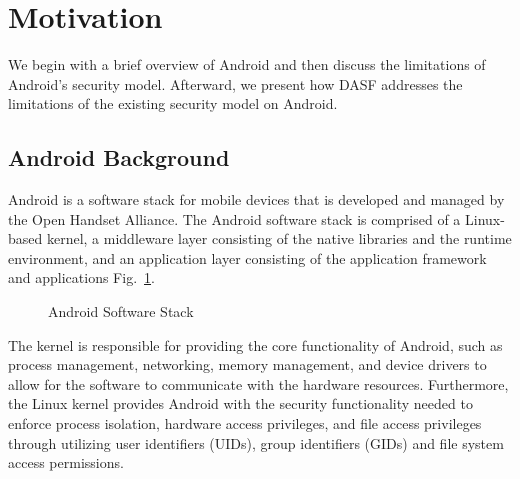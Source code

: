 \section{Motivation}

We begin with a brief overview of Android and then discuss the
limitations of Android's security model.  Afterward, we present
how DASF addresses the limitations of the existing
security model on Android.

\subsection{Android Background}

Android is a software stack for mobile devices that is developed 
and managed by the Open Handset Alliance. The Android software 
stack is comprised of a Linux-based kernel, a middleware layer 
consisting of the native libraries and the runtime environment, 
and an application layer consisting of the application framework 
and applications Fig.~\ref{fig:android}.

\begin{figure}[ht]
\centering
{}
\caption{Android Software Stack}
\label{fig:android}
\end{figure}

The kernel is responsible for providing 
the core functionality of Android, such as process management, 
networking, memory management, and device drivers to allow for 
the software to communicate with the hardware resources. 
Furthermore, the Linux kernel provides Android with the security 
functionality needed to enforce process isolation, hardware 
access privileges, and file access privileges through utilizing 
user identifiers (UIDs), group identifiers (GIDs) and file 
system access permissions.  


